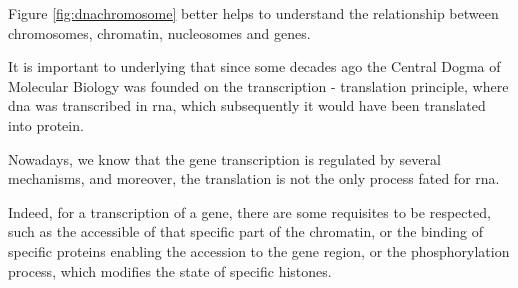 Figure \ref{fig:dnachromosome} better helps  to understand the relationship between chromosomes, chromatin, nucleosomes and genes.

It is important to underlying that since some decades ago the Central Dogma of Molecular Biology was founded on the transcription - translation principle, where \gls{dna} was transcribed in \gls{rna}, which subsequently it would have been translated into protein.

Nowadays, we know that the gene transcription is regulated by several mechanisms, and moreover, the translation is not the only process fated for \gls{rna}.

Indeed, for a transcription of a gene, there are some requisites to be respected, such as the accessible of that specific part of the chromatin, or the binding of specific proteins enabling the accession to the gene region, or the phosphorylation process, which modifies the state of specific histones.
  

